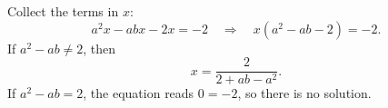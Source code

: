 Collect the terms in $x$:
\[
a^2x-abx-2x=-2\quad\Longrightarrow\quad x\left(a^2-ab-2\right)=-2 .
\]
If $a^2-ab\ne2$, then
\[
\boxed{x=\dfrac{2}{2+ab-a^2}} .
\]
If $a^2-ab=2$, the equation reads $0=-2$, so there is no solution.
